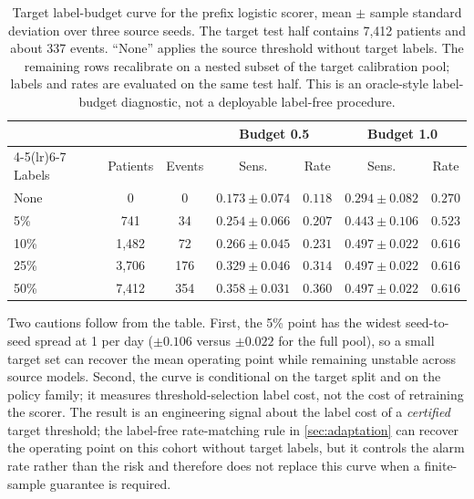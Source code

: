 \begin{table}[H]
\centering
\caption{Target label-budget curve for the prefix logistic scorer, mean $\pm$ sample standard deviation over three source seeds. The target test half contains 7,412 patients and about 337 events. ``None'' applies the source threshold without target labels. The remaining rows recalibrate on a nested subset of the target calibration pool; labels and rates are evaluated on the same test half. This is an oracle-style label-budget diagnostic, not a deployable label-free procedure.}
\label{tab:label-budget}
\small
\begin{tabular}{lcccccc}
\toprule
 & & & \multicolumn{2}{c}{Budget 0.5} & \multicolumn{2}{c}{Budget 1.0} \\
\cmidrule(lr){4-5}\cmidrule(lr){6-7}
Labels & Patients & Events & Sens. & Rate & Sens. & Rate \\
\midrule
None & 0 & 0 & $0.173\pm0.074$ & $0.118$ & $0.294\pm0.082$ & $0.270$ \\
5\% & 741 & 34 & $0.254\pm0.066$ & $0.207$ & $0.443\pm0.106$ & $0.523$ \\
10\% & 1,482 & 72 & $0.266\pm0.045$ & $0.231$ & $0.497\pm0.022$ & $0.616$ \\
25\% & 3,706 & 176 & $0.329\pm0.046$ & $0.314$ & $0.497\pm0.022$ & $0.616$ \\
50\% & 7,412 & 354 & $0.358\pm0.031$ & $0.360$ & $0.497\pm0.022$ & $0.616$ \\
\bottomrule
\end{tabular}
\end{table}

Two cautions follow from the table. First, the 5\% point has the widest seed-to-seed spread at 1 per day ($\pm0.106$ versus $\pm0.022$ for the full pool), so a small target set can recover the mean operating point while remaining unstable across source models. Second, the curve is conditional on the target split and on the policy family; it measures threshold-selection label cost, not the cost of retraining the scorer. The result is an engineering signal about the label cost of a \emph{certified} target threshold; the label-free rate-matching rule in \cref{sec:adaptation} can recover the operating point on this cohort without target labels, but it controls the alarm rate rather than the risk and therefore does not replace this curve when a finite-sample guarantee is required.
